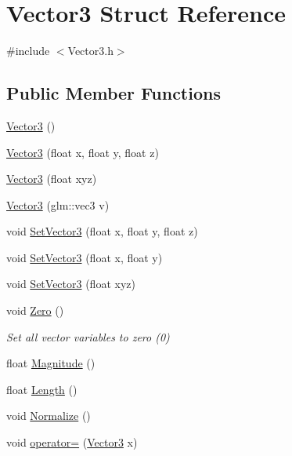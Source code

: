 \hypertarget{struct_vector3}{}\section{Vector3 Struct Reference}
\label{struct_vector3}


{\ttfamily \#include $<$Vector3.\+h$>$}

\subsection*{Public Member Functions}
\begin{DoxyCompactItemize}
\item 
\mbox{\hyperlink{struct_vector3_a0f49191f7e001e7f7ae1cb49522118b4}{Vector3}} ()
\item 
\mbox{\hyperlink{struct_vector3_ad53e22b52babdb90d423601f72467590}{Vector3}} (float x, float y, float z)
\item 
\mbox{\hyperlink{struct_vector3_acc5fe807a5fa0ca5f17427849409a7f7}{Vector3}} (float xyz)
\item 
\mbox{\hyperlink{struct_vector3_a77b6e181107724282b7d95a4d22cfc59}{Vector3}} (glm\+::vec3 v)
\item 
void \mbox{\hyperlink{struct_vector3_adfd21961005c5034c5dc528e44bb5618}{Set\+Vector3}} (float x, float y, float z)
\item 
void \mbox{\hyperlink{struct_vector3_ab21a2d59530bdcc23fd93e3883517bf7}{Set\+Vector3}} (float x, float y)
\item 
void \mbox{\hyperlink{struct_vector3_a633ec8762eb0b3aba6f75ca0560e3e2d}{Set\+Vector3}} (float xyz)
\item 
\mbox{\label{struct_vector3_a7c332c79e400b69c2b075f4b24e24434}} 
void \mbox{\hyperlink{struct_vector3_a7c332c79e400b69c2b075f4b24e24434}{Zero}} ()
\begin{DoxyCompactList}\small\item\em Set all vector variables to zero (0) \end{DoxyCompactList}\item 
float \mbox{\hyperlink{struct_vector3_a5721d97b9640951b58c40de1a893f966}{Magnitude}} ()
\item 
float \mbox{\hyperlink{struct_vector3_ae5218ba9e630cc051924d1b3b66d9c62}{Length}} ()
\item 
void \mbox{\hyperlink{struct_vector3_a9c94cc16049543fc8edaba52c2b266b7}{Normalize}} ()
\item 
void \mbox{\hyperlink{struct_vector3_a922a02c393dbe36e6299cb5a1fe458ac}{operator=}} (\mbox{\hyperlink{struct_vector3}{Vector3}} x)

\end{DoxyCompactItemize}
